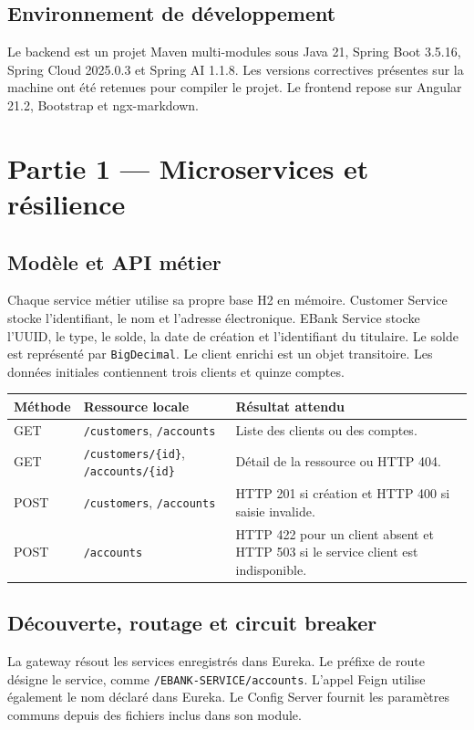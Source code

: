 \documentclass[11pt,a4paper]{article}
\newcommand{\code}[1]{\texttt{#1}}
\begin{document}
\subsection{Environnement de développement}
Le backend est un projet Maven multi-modules sous Java 21, Spring Boot 3.5.16, Spring Cloud 2025.0.3 et Spring AI 1.1.8. Les versions correctives présentes sur la machine ont été retenues pour compiler le projet. Le frontend repose sur Angular 21.2, Bootstrap et ngx-markdown.

\clearpage
\section{Partie 1 — Microservices et résilience}
\subsection{Modèle et API métier}
Chaque service métier utilise sa propre base H2 en mémoire. Customer Service stocke l'identifiant, le nom et l'adresse électronique. EBank Service stocke l'UUID, le type, le solde, la date de création et l'identifiant du titulaire. Le solde est représenté par \code{BigDecimal}. Le client enrichi est un objet transitoire. Les données initiales contiennent trois clients et quinze comptes.

\begin{center}
\begin{tabularx}{\linewidth}{@{}llY@{}}
\toprule
\textbf{Méthode} & \textbf{Ressource locale} & \textbf{Résultat attendu}\\
\midrule
GET & \code{/customers}, \code{/accounts} & Liste des clients ou des comptes.\\
GET & \code{/customers/\{id\}}, \code{/accounts/\{id\}} & Détail de la ressource ou HTTP 404.\\
POST & \code{/customers}, \code{/accounts} & HTTP 201 si création et HTTP 400 si saisie invalide.\\
POST & \code{/accounts} & HTTP 422 pour un client absent et HTTP 503 si le service client est indisponible.\\
\bottomrule
\end{tabularx}
\end{center}

\subsection{Découverte, routage et circuit breaker}
La gateway résout les services enregistrés dans Eureka. Le préfixe de route désigne le service, comme \code{/EBANK-SERVICE/accounts}. L'appel Feign utilise également le nom déclaré dans Eureka. Le Config Server fournit les paramètres communs depuis des fichiers inclus dans son module.
\end{document}
